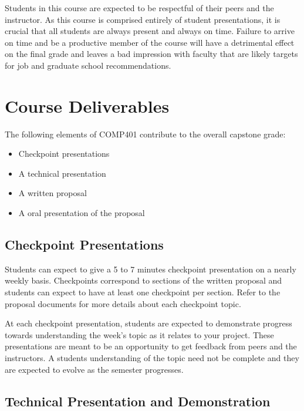 \documentclass[10pt]{article}
\begin{document}
Students in this course are expected to be respectful of their peers and the instructor. As this course is comprised entirely of student presentations, it is crucial that all students are always present and always on time.  Failure to arrive on time and be a productive member of the course will have a detrimental effect on the final grade and leaves a bad impression with faculty that are likely targets for job and graduate school recommendations.

\section{Course Deliverables}

The following elements of COMP401 contribute to the overall capstone grade:
\begin{itemize}
\item Checkpoint presentations
\item A technical presentation
\item A written proposal
\item A oral presentation of the proposal
\end{itemize}


\subsection{Checkpoint Presentations}

Students can expect to give a 5 to 7 minutes checkpoint presentation on a nearly weekly basis. Checkpoints correspond to sections of the written proposal and students can expect to have at least one checkpoint per section. Refer to the proposal documents for more details about each checkpoint topic.

At each checkpoint presentation, students are expected to demonstrate progress towards understanding the week's topic as it relates to your project.  These presentations are meant to be an opportunity to get feedback from peers and the instructors.  A students understanding of the topic need not be complete and they are expected to evolve as the semester progresses.

\subsection{Technical Presentation and Demonstration}
\end{document}
